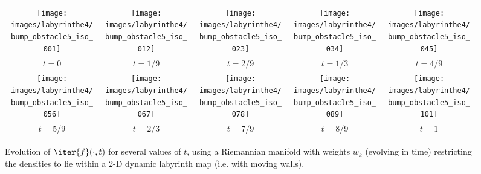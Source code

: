 \begin{figure}[!ht]
\begin{center}
\begin{tabular}{ccccc}
\hspace{-0.2cm}\texttt{[image: images/labyrinthe4/bump\_obstacle5\_iso\_001]}&
\hspace{-0.4cm}\texttt{[image: images/labyrinthe4/bump\_obstacle5\_iso\_012]}&
\hspace{-0.4cm}\texttt{[image: images/labyrinthe4/bump\_obstacle5\_iso\_023]}&
\hspace{-0.4cm}\texttt{[image: images/labyrinthe4/bump\_obstacle5\_iso\_034]}&
\hspace{-0.4cm}\texttt{[image: images/labyrinthe4/bump\_obstacle5\_iso\_045]}\\
\hspace{-0.2cm}$t=0$&
\hspace{-0.4cm}$t=1/9$&
\hspace{-0.4cm}$t=2/9$&
\hspace{-0.4cm}$t=1/3$&
\hspace{-0.4cm}$t=4/9$\\
\hspace{-0.2cm}\texttt{[image: images/labyrinthe4/bump\_obstacle5\_iso\_056]}&
\hspace{-0.4cm}\texttt{[image: images/labyrinthe4/bump\_obstacle5\_iso\_067]}&
\hspace{-0.4cm}\texttt{[image: images/labyrinthe4/bump\_obstacle5\_iso\_078]}&
\hspace{-0.4cm}\texttt{[image: images/labyrinthe4/bump\_obstacle5\_iso\_089]}&
\hspace{-0.4cm}\texttt{[image: images/labyrinthe4/bump\_obstacle5\_iso\_101]}\\
\hspace{-0.2cm}$t=5/9$&
\hspace{-0.4cm}$t=2/3$&
\hspace{-0.4cm}$t=7/9$&
\hspace{-0.4cm}$t=8/9$&\hspace{-0.35cm}$t=1$
\end{tabular}
\caption{\label{labyrinthe2} Evolution of $\iter{f}(\cdot,t)$ for several values of $t$, using a Riemannian  manifold with weights $w_k$ (evolving in time) restricting the densities to lie within a 2-D dynamic labyrinth map (i.e. with moving walls). }
\end{center}
\end{figure}
